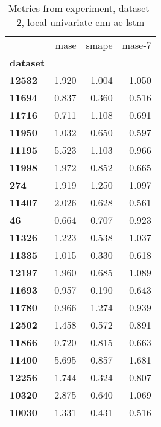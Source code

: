 \begin{table}[h]
\centering
\caption{Metrics from experiment, dataset-2, local univariate cnn ae lstm}
\label{table:local-univariate-cnn-ae-lstm-dataset-2}
\begin{tabular}{lrrr}
\toprule
{} &   mase &  smape &  mase-7 \\
\textbf{dataset} &        &        &         \\
\midrule
\textbf{12532  } &  1.920 &  1.004 &   1.050 \\
\textbf{11694  } &  0.837 &  0.360 &   0.516 \\
\textbf{11716  } &  0.711 &  1.108 &   0.691 \\
\textbf{11950  } &  1.032 &  0.650 &   0.597 \\
\textbf{11195  } &  5.523 &  1.103 &   0.966 \\
\textbf{11998  } &  1.972 &  0.852 &   0.665 \\
\textbf{274    } &  1.919 &  1.250 &   1.097 \\
\textbf{11407  } &  2.026 &  0.628 &   0.561 \\
\textbf{46     } &  0.664 &  0.707 &   0.923 \\
\textbf{11326  } &  1.223 &  0.538 &   1.037 \\
\textbf{11335  } &  1.015 &  0.330 &   0.618 \\
\textbf{12197  } &  1.960 &  0.685 &   1.089 \\
\textbf{11693  } &  0.957 &  0.190 &   0.643 \\
\textbf{11780  } &  0.966 &  1.274 &   0.939 \\
\textbf{12502  } &  1.458 &  0.572 &   0.891 \\
\textbf{11866  } &  0.720 &  0.815 &   0.663 \\
\textbf{11400  } &  5.695 &  0.857 &   1.681 \\
\textbf{12256  } &  1.744 &  0.324 &   0.807 \\
\textbf{10320  } &  2.875 &  0.640 &   1.069 \\
\textbf{10030  } &  1.331 &  0.431 &   0.516 \\
\bottomrule
\end{tabular}
\end{table}
